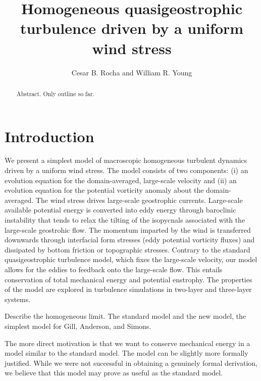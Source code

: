 \documentclass{jfm}
\title{Homogeneous quasigeostrophic turbulence driven by a uniform wind stress}
\author{Cesar B. Rocha and William R. Young
 }
\affiliation{Scripps Institution of Oceanography,
University of California San Diego, La Jolla, CA, USA}
\begin{document}
\maketitle


\begin{abstract}
Abstract. Only outline so far.
\end{abstract}



\begin{keywords}

\end{keywords}

\section{Introduction}\label{sec:introduction}

We present a simplest model of macroscopic homogeneous turbulent dynamics driven
by a uniform wind stress. The model consists of two components: (i) an evolution
equation for the domain-averaged, large-scale velocity and (ii) an evolution
equation for the potential vorticity anomaly about the domain-averaged. The wind
stress drives large-scale geostrophic currents. Large-scale available potential
energy is converted into eddy energy through baroclinic instability that tends to
relax the tilting of the isopycnals associated with the large-scale geostrohic flow.
The momentum imparted by the wind is transferred downwards through interfacial
form stresses (eddy potential vorticity fluxes) and dissipated by bottom friction
or topographic stresses. Contrary to the standard quasigeostrophic turbulence
model, which fixes the large-scale velocity, our   model allows for the eddies to
feedback onto the large-scale flow. This entails conservation of total mechanical
energy and potential enstrophy. The properties of the model are explored in
turbulence simulations in two-layer and three-layer systems.

Describe the homogeneous limit. The standard model and the new model, the simplest
model for Gill, Anderson, and Simons.

The more direct motivation is that we want to conserve mechanical energy in a model
similar to the standard model. The model can be slightly more formally justified.
While we were not successful in obtaining a genuinely formal derivation, we
believe that this model may prove as useful as the standard model.
\end{document}
